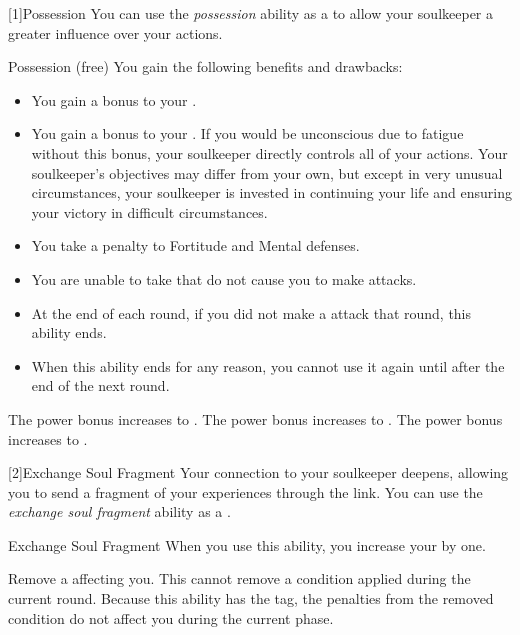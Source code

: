         [1]{Possession} You can use the \textit{possession} ability as a  to allow your soulkeeper a greater influence over your actions.
        \begin{durationability}{Possession}
             (free)
            \rankline
            You gain the following benefits and drawbacks:
            \begin{itemize}
                \item You gain a  bonus to your  .
                \item You gain a  bonus to your .
                    If you would be unconscious due to fatigue without this bonus, your soulkeeper directly controls all of your actions.
                    Your soulkeeper's objectives may differ from your own, but except in very unusual circumstances, your soulkeeper is invested in continuing your life and ensuring your victory in difficult circumstances.
                \item You take a  penalty to Fortitude and Mental defenses.
                \item You are unable to take  that do not cause you to make  attacks.
                \item At the end of each round, if you did not make a  attack that round, this ability ends.
                \item When this ability ends for any reason, you cannot use it again until after the end of the next round.
            \end{itemize}

            \rankline
             The power bonus increases to .
             The power bonus increases to .
             The power bonus increases to .
        \end{durationability}

        [2]{Exchange Soul Fragment} Your connection to your soulkeeper deepens, allowing you to send a fragment of your experiences through the link.
        You can use the \textit{exchange soul fragment} ability as a .
        \begin{instantability}{Exchange Soul Fragment}
            \rankline
            When you use this ability, you increase your  by one.

            Remove a  affecting you.
            This cannot remove a condition applied during the current round.
            Because this ability has the  tag, the penalties from the removed condition do not affect you during the current phase.
        \end{instantability}

